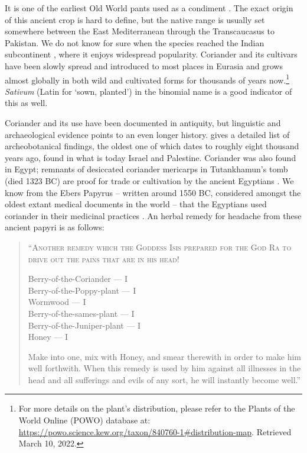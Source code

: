 \documentclass[12pt]{article}
\begin{document}
It is one of the earliest Old World pants used as a condiment \parencite{zohary_domestication_2012}. The exact origin of this ancient crop is hard to define, but the native range is usually set somewhere between the East Mediterranean through the Transcaucasus to Pakistan. We do not know for sure when the species reached the Indian subcontinent \parencite{prance_cultural_2005}, where it enjoys widespread popularity. Coriander and its cultivars have been slowly spread and introduced to most places in Eurasia and grows almost globally in both wild and cultivated forms for thousands of years now.\footnote{For more details on the plant’s distribution, please refer to the Plants of the World Online (POWO) database at: \url{https://powo.science.kew.org/taxon/840760-1\#distribution-map}. Retrieved March 10, 2022.} \textit{Sativum} (Latin for `sown, planted') in the binomial name is a good indicator of this as well.

Coriander and its use have been documented in antiquity, but linguistic and archaeological evidence points to an even longer history. \textcite[163]{zohary_domestication_2012} gives a detailed list of archeobotanical findings, the oldest one of which dates to roughly eight thousand years ago, found in what is today Israel and Palestine. Coriander was also found in Egypt; remnants of desiccated coriander mericarps in Tutankhamun’s tomb (died 1323 BC) are proof for trade or cultivation by the ancient Egyptians \parencite{zohary_domestication_2012}. We know from the Ebers Papyrus – written around 1550 BC, considered amongst the oldest extant medical documents in the world – that the Egyptians used coriander in their medicinal practices \parencite{prance_cultural_2005}. An herbal remedy for headache from these ancient papyri is as follows:

\begin{quote}
\textsc{``Another remedy which the Goddess Isis prepared for the God Ra to drive out the pains that are in his head!}

\smallskip
Berry-of-the-Coriander --- I\\
Berry-of-the-Poppy-plant --- I\\
Wormwood --- I\\
Berry-of-the-sames-plant --- I\\
Berry-of-the-Juniper-plant --- I\\
Honey --- I
\smallskip

Make into one, mix with Honey, and smear therewith in order to make him well forthwith. When this remedy is used by him against all illnesses in the head and all sufferings and evils of any sort, he will instantly become well.'' \textcite[40]{bryan_papyrus_1930}
\end{quote}
\end{document}
